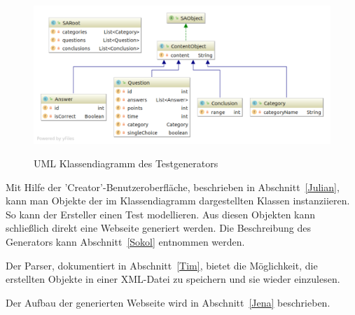 \begin{figure}
	 \centering
	 \caption{UML Klassendiagramm des Testgenerators}
	\includegraphics[width = \textwidth]{domain-class-diagram.pdf}
	\label{fig:umlCD}
\end{figure}

Mit Hilfe der 'Creator'-Benutzeroberfläche, beschrieben in Abschnitt~\ref{Julian}, kann man Objekte der im Klassendiagramm dargestellten Klassen instanziieren. 
So kann der Ersteller einen Test modellieren.
Aus diesen Objekten kann schließlich direkt eine Webseite generiert werden. 
Die Beschreibung des Generators kann Abschnitt~\ref{Sokol} entnommen werden.

Der Parser, dokumentiert in Abschnitt~\ref{Tim}, bietet die Möglichkeit, die erstellten Objekte in einer XML-Datei zu speichern und sie wieder einzulesen.

Der Aufbau der generierten Webseite wird in Abschnitt~\ref{Jena} beschrieben.



